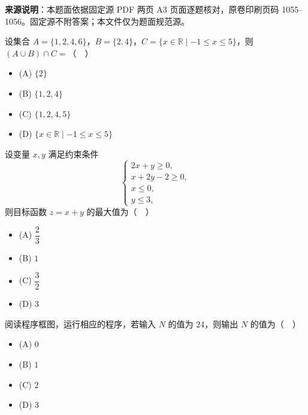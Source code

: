 

\begin{gktip}
\textbf{来源说明}：本题面依据固定源 PDF 两页 A3 页面逐题核对，原卷印刷页码 1055–1056。固定源不附答案；本文件仅为题面规范源。
\end{gktip}


\begin{question}
设集合 $A=\{1,2,4,6\}$，$B=\{2,4\}$，$C=\{x\in\mathbb R\mid -1\leqslant x\leqslant5\}$，则 $(A\cup B)\cap C=$（　）

\begin{itemize}
\item (A) $\{2\}$
\item (B) $\{1,2,4\}$
\item (C) $\{1,2,4,5\}$
\item (D) $\{x\in\mathbb R\mid -1\leqslant x\leqslant5\}$
\end{itemize}

\end{question}
\begin{question}
设变量 $x,y$ 满足约束条件
\nopagebreak[4]
\[
\begin{cases}
2x+y\geqslant0,\\
x+2y-2\geqslant0,\\
x\leqslant0,\\
y\leqslant3,
\end{cases}
\]
则目标函数 $z=x+y$ 的最大值为（　）

\begin{itemize}
\item (A) $\dfrac23$
\item (B) $1$
\item (C) $\dfrac32$
\item (D) $3$
\end{itemize}

\Needspace{0.4\textheight}
\end{question}
\begingroup
\renewenvironment{question}{\Needspace{0.5\textheight}}{}
\begin{question}

阅读程序框图，运行相应的程序，若输入 $N$ 的值为 $24$，则输出 $N$ 的值为（　）
\nopagebreak[4]
\begin{center}\end{center}
\nopagebreak[4]
\begin{itemize}
\item (A) $0$
\item (B) $1$
\item (C) $2$
\item (D) $3$
\end{itemize}

\end{question}
